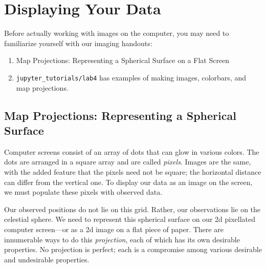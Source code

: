 \documentclass[psfig,preprint]{aastex}
\begin{document}
\section{Displaying Your Data} \label{datadisplay}

\noindent
Before actually working with images on the computer, you may need to
familiarize yourself with our imaging handouts:
\begin{enumerate}

\item Map Projections: Representing a Spherical Surface on a Flat Screen

\item {\tt jupyter\_tutorials/lab4} has examples of making images, colorbars, and map projections.
\end{enumerate}

\subsection{Map Projections: Representing a Spherical Surface}

\noindent
Computer screens consist of an array of dots that can glow in various
colors. The dots are arranged in a square array and are called {\it
  pixels}. Images are the same, with the added feature that
the pixels need not be square; the horizontal distance can
differ from the vertical one. To display our data as an image on the
screen, we must populate these pixels with observed data. 

Our observed positions do not lie on this grid. Rather, our observations
lie on the celestial sphere. We need to represent this spherical surface
on our 2d pixellated computer screen---or as a 2d image on
a flat piece of paper. There are innumerable ways to do this
{\it projection}, each of which has its own
desirable properties. No projection is perfect; each is a compromise 
among various desirable and undesirable properties. 
\end{document}
